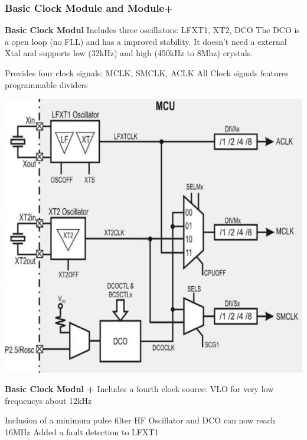 \subsubsection{Basic Clock Module and Module+ }
\begin{minipage}{0.585\linewidth}
    \textbf{Basic Clock Modul}\newline
    Includes three oscillators:\newline
    LFXT1, XT2, DCO\newline
    The DCO is a open loop (no FLL) and has a improved stability. \newline
    It doesn't need a external Xtal and supports low (32kHz) and high (450kHz to 8Mhz) crystals.\newline\newline
    
    Provides four clock signals:\newline
    MCLK, SMCLK, ACLK \newline
    All Clock signals features programmable dividers
\end{minipage}
\begin{minipage}{0.41\linewidth}
    \includegraphics[width=0.8\linewidth]{images/BasicClock} 
\end{minipage}
\vspace{0.5cm}
\begin{minipage}{0.585\linewidth}
    \textbf{Basic Clock Modul +}\newline
    Includes a fourth clock source:\newline
    VLO for very low frequencys about 12kHz\newline\newline
    
    Inclusion of a minimum pulse filter \newline
    HF Oscillator and DCO can now reach 16MHz\newline
    Added a fault detection to LFXT1
\end{minipage}
